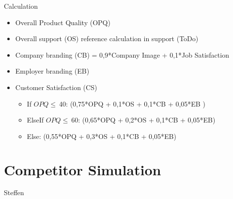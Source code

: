 \documentclass[11pt,titlepage,oneside,openany]{book}
\begin{document}
Calculation
\begin{itemize}
    \item Overall Product Quality (OPQ)
    \item Overall support (OS) reference calculation in support (ToDo)
    \item Company branding (CB) = 0,9*Company Image + 0,1*Job Satisfaction
    \item Employer branding (EB) 
    \item Customer Satisfaction (CS)
    \begin{itemize}
    \item If $OPQ \leq \ $40: (0,75*OPQ + 0,1*OS + 0,1*CB + 0,05*EB )
    \item ElseIf $OPQ \leq \ $60: (0,65*OPQ + 0,2*OS + 0,1*CB + 0,05*EB)
    \item Else: (0,55*OPQ + 0,3*OS + 0,1*CB + 0,05*EB)
    \end{itemize}
\end{itemize}

\section{Competitor Simulation}
Steffen
\end{document}
